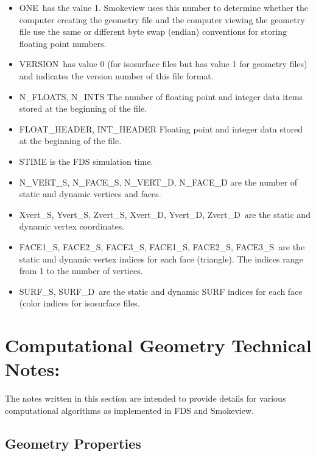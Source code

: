\documentclass[12pt]{article}
\begin{document}
\begin{itemize}
\item {\ct ONE}\ has the value 1. Smokeview uses this number to determine whether the computer creating the geometry file and the computer viewing the geometry file use the same or different byte swap (endian) conventions for storing floating point numbers.
\item {\ct VERSION}\ has value 0 (for isosurface files but has value 1 for geometry files) and indicates the version number of this file format.
\item {\ct N\_FLOATS, N\_INTS} The number of floating point and integer data items stored at the beginning of the file.
\item {\ct FLOAT\_HEADER, INT\_HEADER} Floating point and integer data stored at the beginning of the file.
\item {\ct STIME} is the FDS simulation time.
\item {\ct N\_VERT\_S, N\_FACE\_S, N\_VERT\_D, N\_FACE\_D} are the number of static and dynamic vertices and faces.
\item {\ct Xvert\_S, Yvert\_S, Zvert\_S, Xvert\_D, Yvert\_D, Zvert\_D}\ are the static and dynamic vertex coordinates.
\item {\ct FACE1\_S, FACE2\_S, FACE3\_S, FACE1\_S, FACE2\_S, FACE3\_S}\ are the static and dynamic vertex indices for each face (triangle).
    The indices range from 1 to the number of vertices.
\item {\ct SURF\_S, SURF\_D}\ are the static and dynamic SURF indices for each face (color indices for isosurface files.
\end{itemize}









\section{Computational Geometry Technical Notes:}

The notes written in this section are intended to provide details for various computational algorithms as implemented in FDS and Smokeview.



\subsection{Geometry Properties}
\end{document}
